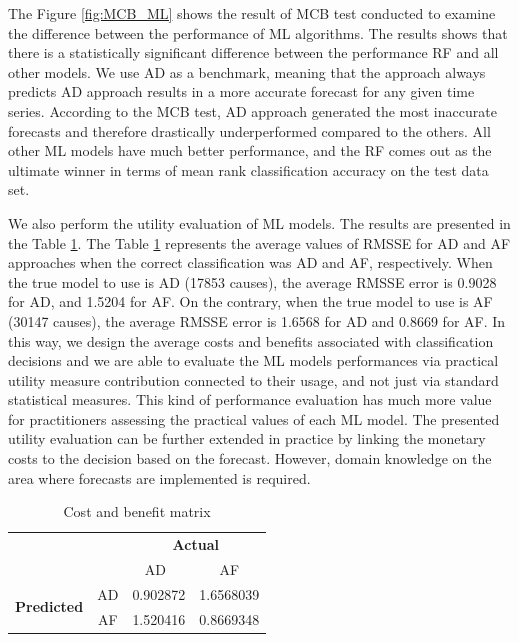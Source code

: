 \documentclass[]{elsarticle} %
\begin{document}
The Figure \ref{fig:MCB_ML} shows the result of MCB test conducted to
examine the difference between the performance of ML algorithms. The
results shows that there is a statistically significant difference
between the performance RF and all other models. We use AD as a
benchmark, meaning that the approach always predicts AD approach results
in a more accurate forecast for any given time series. According to the
MCB test, AD approach generated the most inaccurate forecasts and
therefore drastically underperformed compared to the others. All other
ML models have much better performance, and the RF comes out as the
ultimate winner in terms of mean rank classification accuracy on the
test data set.

We also perform the utility evaluation of ML models. The results are
presented in the Table \ref{tab:matrix}. The Table \ref{tab:matrix}
represents the average values of RMSSE for AD and AF approaches when the
correct classification was AD and AF, respectively. When the true model
to use is AD (17853 causes), the average RMSSE error is 0.9028 for AD,
and 1.5204 for AF. On the contrary, when the true model to use is AF
(30147 causes), the average RMSSE error is 1.6568 for AD and 0.8669 for
AF. In this way, we design the average costs and benefits associated
with classification decisions and we are able to evaluate the ML models
performances via practical utility measure contribution connected to
their usage, and not just via standard statistical measures. This kind
of performance evaluation has much more value for practitioners
assessing the practical values of each ML model. The presented utility
evaluation can be further extended in practice by linking the monetary
costs to the decision based on the forecast. However, domain knowledge
on the area where forecasts are implemented is required.

\begin{table}
\caption{\label{tab:matrix}Cost and benefit matrix}
\centering
\begin{tabular}[t]{lccc}

\multicolumn{2}{c}{} & \multicolumn{2}{c}{\bf Actual}\\ 
\cline{3-4}
& & AD\  & AF\\
\hline
\multirow{2}{4em}{\bf Predicted} & AD & 0.902872 & 1.6568039\\
& AF & 1.520416 & 0.8669348\\
\hline
\end{tabular}
\end{table}
\end{document}
